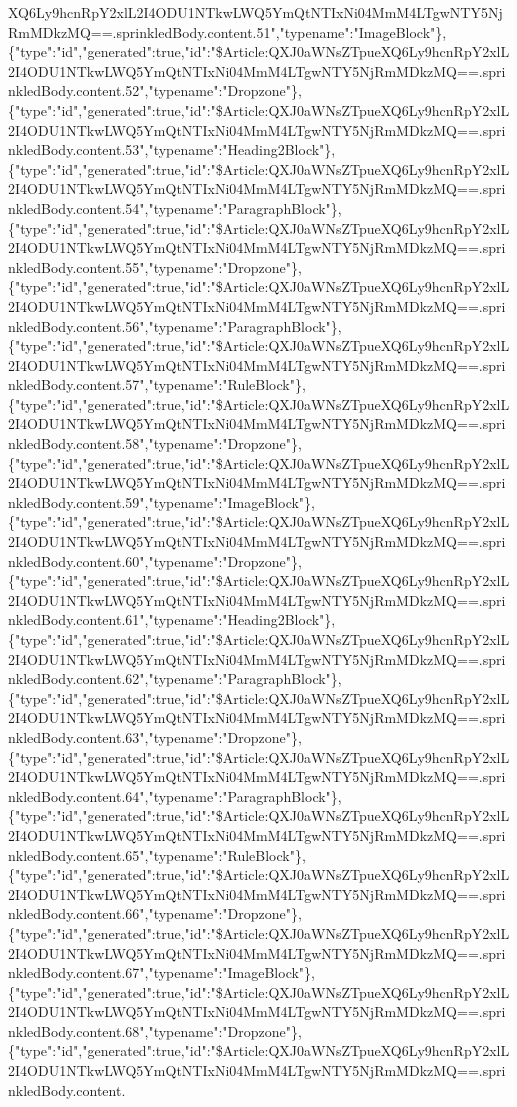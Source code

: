 XQ6Ly9hcnRpY2xlL2I4ODU1NTkwLWQ5YmQtNTIxNi04MmM4LTgwNTY5NjRmMDkzMQ==.sprinkledBody.content.51","typename":"ImageBlock"\},\{"type":"id","generated":true,"id":"\$Article:QXJ0aWNsZTpueXQ6Ly9hcnRpY2xlL2I4ODU1NTkwLWQ5YmQtNTIxNi04MmM4LTgwNTY5NjRmMDkzMQ==.sprinkledBody.content.52","typename":"Dropzone"\},\{"type":"id","generated":true,"id":"\$Article:QXJ0aWNsZTpueXQ6Ly9hcnRpY2xlL2I4ODU1NTkwLWQ5YmQtNTIxNi04MmM4LTgwNTY5NjRmMDkzMQ==.sprinkledBody.content.53","typename":"Heading2Block"\},\{"type":"id","generated":true,"id":"\$Article:QXJ0aWNsZTpueXQ6Ly9hcnRpY2xlL2I4ODU1NTkwLWQ5YmQtNTIxNi04MmM4LTgwNTY5NjRmMDkzMQ==.sprinkledBody.content.54","typename":"ParagraphBlock"\},\{"type":"id","generated":true,"id":"\$Article:QXJ0aWNsZTpueXQ6Ly9hcnRpY2xlL2I4ODU1NTkwLWQ5YmQtNTIxNi04MmM4LTgwNTY5NjRmMDkzMQ==.sprinkledBody.content.55","typename":"Dropzone"\},\{"type":"id","generated":true,"id":"\$Article:QXJ0aWNsZTpueXQ6Ly9hcnRpY2xlL2I4ODU1NTkwLWQ5YmQtNTIxNi04MmM4LTgwNTY5NjRmMDkzMQ==.sprinkledBody.content.56","typename":"ParagraphBlock"\},\{"type":"id","generated":true,"id":"\$Article:QXJ0aWNsZTpueXQ6Ly9hcnRpY2xlL2I4ODU1NTkwLWQ5YmQtNTIxNi04MmM4LTgwNTY5NjRmMDkzMQ==.sprinkledBody.content.57","typename":"RuleBlock"\},\{"type":"id","generated":true,"id":"\$Article:QXJ0aWNsZTpueXQ6Ly9hcnRpY2xlL2I4ODU1NTkwLWQ5YmQtNTIxNi04MmM4LTgwNTY5NjRmMDkzMQ==.sprinkledBody.content.58","typename":"Dropzone"\},\{"type":"id","generated":true,"id":"\$Article:QXJ0aWNsZTpueXQ6Ly9hcnRpY2xlL2I4ODU1NTkwLWQ5YmQtNTIxNi04MmM4LTgwNTY5NjRmMDkzMQ==.sprinkledBody.content.59","typename":"ImageBlock"\},\{"type":"id","generated":true,"id":"\$Article:QXJ0aWNsZTpueXQ6Ly9hcnRpY2xlL2I4ODU1NTkwLWQ5YmQtNTIxNi04MmM4LTgwNTY5NjRmMDkzMQ==.sprinkledBody.content.60","typename":"Dropzone"\},\{"type":"id","generated":true,"id":"\$Article:QXJ0aWNsZTpueXQ6Ly9hcnRpY2xlL2I4ODU1NTkwLWQ5YmQtNTIxNi04MmM4LTgwNTY5NjRmMDkzMQ==.sprinkledBody.content.61","typename":"Heading2Block"\},\{"type":"id","generated":true,"id":"\$Article:QXJ0aWNsZTpueXQ6Ly9hcnRpY2xlL2I4ODU1NTkwLWQ5YmQtNTIxNi04MmM4LTgwNTY5NjRmMDkzMQ==.sprinkledBody.content.62","typename":"ParagraphBlock"\},\{"type":"id","generated":true,"id":"\$Article:QXJ0aWNsZTpueXQ6Ly9hcnRpY2xlL2I4ODU1NTkwLWQ5YmQtNTIxNi04MmM4LTgwNTY5NjRmMDkzMQ==.sprinkledBody.content.63","typename":"Dropzone"\},\{"type":"id","generated":true,"id":"\$Article:QXJ0aWNsZTpueXQ6Ly9hcnRpY2xlL2I4ODU1NTkwLWQ5YmQtNTIxNi04MmM4LTgwNTY5NjRmMDkzMQ==.sprinkledBody.content.64","typename":"ParagraphBlock"\},\{"type":"id","generated":true,"id":"\$Article:QXJ0aWNsZTpueXQ6Ly9hcnRpY2xlL2I4ODU1NTkwLWQ5YmQtNTIxNi04MmM4LTgwNTY5NjRmMDkzMQ==.sprinkledBody.content.65","typename":"RuleBlock"\},\{"type":"id","generated":true,"id":"\$Article:QXJ0aWNsZTpueXQ6Ly9hcnRpY2xlL2I4ODU1NTkwLWQ5YmQtNTIxNi04MmM4LTgwNTY5NjRmMDkzMQ==.sprinkledBody.content.66","typename":"Dropzone"\},\{"type":"id","generated":true,"id":"\$Article:QXJ0aWNsZTpueXQ6Ly9hcnRpY2xlL2I4ODU1NTkwLWQ5YmQtNTIxNi04MmM4LTgwNTY5NjRmMDkzMQ==.sprinkledBody.content.67","typename":"ImageBlock"\},\{"type":"id","generated":true,"id":"\$Article:QXJ0aWNsZTpueXQ6Ly9hcnRpY2xlL2I4ODU1NTkwLWQ5YmQtNTIxNi04MmM4LTgwNTY5NjRmMDkzMQ==.sprinkledBody.content.68","typename":"Dropzone"\},\{"type":"id","generated":true,"id":"\$Article:QXJ0aWNsZTpueXQ6Ly9hcnRpY2xlL2I4ODU1NTkwLWQ5YmQtNTIxNi04MmM4LTgwNTY5NjRmMDkzMQ==.sprinkledBody.content.